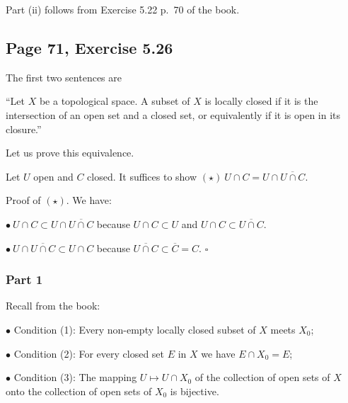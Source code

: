 \documentclass[parskip=half,fontsize=12pt]{scrartcl}%
\newcommand{\bu}{\bullet}
\begin{document}
Part (ii) %
follows from Exercise 5.22 p.~70 of the book.

\subsection{Page 71, Exercise 5.26}%

The first two sentences are

``Let $X$ be a topological space. A subset of $X$ is locally closed if it is the intersection of an open set and a closed set, or equivalently if it is open in its closure.'' 

Let us prove this equivalence.

Let $U$ open and $C$ closed. It suffices to show $(\star)\ U\cap C=U\cap\overline{U\cap C}$. 

Proof of $(\star)$. We have:

$\bullet\ U\cap C\subset U\cap\overline{U\cap C}$ because $U\cap C\subset U$ and $U\cap C\subset\overline{U\cap C}$.

$\bullet\ U\cap\overline{U\cap C}\subset U\cap C$ because $\overline{U\cap C}\subset\overline C=C$. $\square$ %

\subsubsection{Part 1} 

Recall from the book: 

$\bu$ Condition (1): Every non-empty locally closed subset of $X$ meets $X_0$;

$\bu$ Condition (2): For every closed set $E$ in $X$ we have $E\cap X_0 =E$;

$\bu$ Condition (3): The mapping $U\mapsto U\cap X_0$ of the collection of open sets of $X$ onto the collection of open sets of $X_0$ is bijective.
\end{document}
